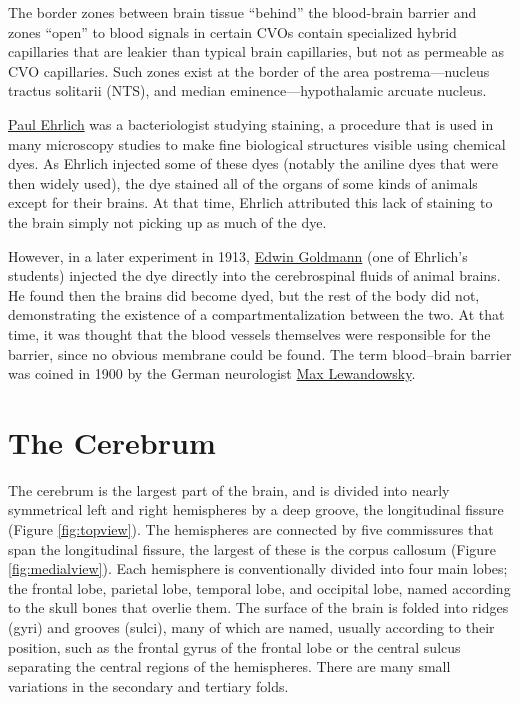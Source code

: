 The border zones between brain tissue ``behind'' the blood-brain barrier and zones ``open'' to blood signals in certain CVOs contain specialized hybrid capillaries that are leakier than typical brain capillaries, but not as permeable as CVO capillaries. Such zones exist at the border of the area postrema---nucleus tractus solitarii (NTS), and median eminence---hypothalamic arcuate nucleus.

\href{https://en.wikipedia.org/wiki/Paul_Ehrlich}{Paul Ehrlich} was a bacteriologist studying staining, a procedure that is used in many microscopy studies to make fine biological structures visible using chemical dyes. As Ehrlich injected some of these dyes (notably the aniline dyes that were then widely used), the dye stained all of the organs of some kinds of animals except for their brains. At that time, Ehrlich attributed this lack of staining to the brain simply not picking up as much of the dye.

However, in a later experiment in 1913, \href{https://en.wikipedia.org/wiki/Edwin_Goldmann}{Edwin Goldmann} (one of Ehrlich's students) injected the dye directly into the cerebrospinal fluids of animal brains. He found then the brains did become dyed, but the rest of the body did not, demonstrating the existence of a compartmentalization between the two. At that time, it was thought that the blood vessels themselves were responsible for the barrier, since no obvious membrane could be found. The term blood--brain barrier was coined in 1900 by the German neurologist \href{https://en.wikipedia.org/wiki/Max_Lewandowsky}{Max Lewandowsky}.

\hypertarget{the-cerebrum}{%
\section{The Cerebrum}\label{the-cerebrum}}

The cerebrum is the largest part of the brain, and is divided into nearly symmetrical left and right hemispheres by a deep groove, the longitudinal fissure (Figure \ref{fig:topview}). The hemispheres are connected by five commissures that span the longitudinal fissure, the largest of these is the corpus callosum (Figure \ref{fig:medialview}). Each hemisphere is conventionally divided into four main lobes; the frontal lobe, parietal lobe, temporal lobe, and occipital lobe, named according to the skull bones that overlie them. The surface of the brain is folded into ridges (gyri) and grooves (sulci), many of which are named, usually according to their position, such as the frontal gyrus of the frontal lobe or the central sulcus separating the central regions of the hemispheres. There are many small variations in the secondary and tertiary folds.




